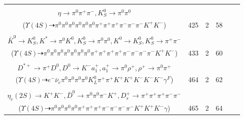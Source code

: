 \documentclass[landscape]{article}
\newcounter{rownumbers}
\newcommand\rn{\stepcounter{rownumbers}\arabic{rownumbers}}
\newcommand{\EOLP}{\\ \hline} %
\newcommand{\topoTags}[1]{#1} %
\begin{document}
\begin{longtable}{clcccc}
\rn & \makecell[l]{ $ 
\Upsilon(4S) \rightarrow B^{0} B^{0} ,
B^{0} \rightarrow K^{-} K_{0}^{*+} ,
B^{0} \rightarrow \pi^{0} \pi^{+} \omega D^{-} ,
K_{0}^{*+} \rightarrow \pi^{0} K^{+} ,
\omega \rightarrow \pi^{0} \pi^{+} \pi^{-} ,
D^{-} \rightarrow \pi^{-} \eta K_{S}^{0} ,
$ \\ $
\eta \rightarrow \pi^{0} \pi^{+} \pi^{-} ,
K_{S}^{0} \rightarrow \pi^{0} \pi^{0} 
$ \\ ($
\Upsilon(4S) \dashrightarrow \pi^{0} \pi^{0} \pi^{0} \pi^{0} \pi^{0} \pi^{0} \pi^{+} \pi^{+} \pi^{+} \pi^{-} \pi^{-} \pi^{-} K^{+} K^{-} 
$) } & \topoTags{425 & }2 & 58 \EOLP

\rn & \makecell[l]{ $ 
\Upsilon(4S) \rightarrow B^{0} \bar{B}^{0} ,
B^{0} \rightarrow \pi^{0} \pi^{0} \omega \omega \bar{D}^{0} ,
\bar{B}^{0} \rightarrow \bar{K}^{0} K^{+} K^{-} ,
\omega \rightarrow \pi^{0} \pi^{+} \pi^{-} ,
\omega \rightarrow \pi^{0} \pi^{+} \pi^{-} ,
\bar{D}^{0} \rightarrow \pi^{+} \pi^{-} K^{*} ,
$ \\ $
\bar{K}^{0} \rightarrow K_{S}^{0} ,
K^{*} \rightarrow \pi^{0} K^{0} ,
K_{S}^{0} \rightarrow \pi^{0} \pi^{0} ,
K^{0} \rightarrow K_{S}^{0} ,
K_{S}^{0} \rightarrow \pi^{+} \pi^{-} 
$ \\ ($
\Upsilon(4S) \dashrightarrow \pi^{0} \pi^{0} \pi^{0} \pi^{0} \pi^{0} \pi^{0} \pi^{0} \pi^{+} \pi^{+} \pi^{+} \pi^{+} \pi^{-} \pi^{-} \pi^{-} \pi^{-} K^{+} K^{-} 
$) } & \topoTags{433 & }2 & 60 \EOLP

\rn & \makecell[l]{ $ 
\Upsilon(4S) \rightarrow B^{0} \bar{B}^{0} ,
B^{0} \rightarrow \pi^{0} \bar{D}^{0} ,
\bar{B}^{0} \rightarrow \pi^{0} K^{0} K^{-} \phi D^{*+} ,
\bar{D}^{0} \rightarrow e^{-} \bar{\nu}_{e} K^{+} \gamma^{F} ,
K^{0} \rightarrow K_{L}^{0} ,
\phi \rightarrow K^{+} K^{-} ,
$ \\ $
D^{*+} \rightarrow \pi^{+} D^{0} ,
D^{0} \rightarrow K^{-} a_{1}^{+} ,
a_{1}^{+} \rightarrow \pi^{0} \rho^{+} ,
\rho^{+} \rightarrow \pi^{0} \pi^{+} 
$ \\ ($
\Upsilon(4S) \dashrightarrow e^{-} \bar{\nu}_{e} \pi^{0} \pi^{0} \pi^{0} \pi^{0} K_{L}^{0} \pi^{+} \pi^{+} K^{+} K^{+} K^{-} K^{-} K^{-} \gamma^{F} 
$) } & \topoTags{464 & }2 & 62 \EOLP

\rn & \makecell[l]{ $ 
\Upsilon(4S) \rightarrow B^{0} \bar{B}^{0} ,
B^{0} \rightarrow D^{*-} D_{s}^{*+} ,
\bar{B}^{0} \rightarrow K_{S}^{0} \eta_{c}(2S) ,
D^{*-} \rightarrow \pi^{-} \bar{D}^{0} ,
D_{s}^{*+} \rightarrow D_{s}^{+} \gamma ,
K_{S}^{0} \rightarrow \pi^{0} \pi^{0} ,
$ \\ $
\eta_{c}(2S) \rightarrow K^{+} K^{-} ,
\bar{D}^{0} \rightarrow \pi^{0} \pi^{0} \pi^{-} K^{+} ,
D_{s}^{+} \rightarrow \pi^{+} \pi^{+} \pi^{+} \pi^{-} \pi^{-} 
$ \\ ($
\Upsilon(4S) \dashrightarrow \pi^{0} \pi^{0} \pi^{0} \pi^{0} \pi^{+} \pi^{+} \pi^{+} \pi^{-} \pi^{-} \pi^{-} \pi^{-} K^{+} K^{+} K^{-} \gamma 
$) } & \topoTags{465 & }2 & 64 \EOLP


\end{longtable}
\end{document}
